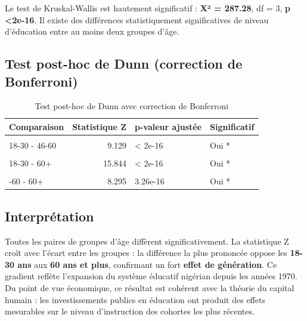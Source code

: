 \documentclass[
]{article}
\begin{document}
Le test de Kruskal-Wallis est hautement significatif : \textbf{X² =
287.28}, df = 3, \textbf{p \textless2e-16}. Il existe des différences
statistiquement significatives de niveau d'éducation entre au moins deux
groupes d'âge.

\subsection{Test post-hoc de Dunn (correction de
Bonferroni)}\label{test-post-hoc-de-dunn-correction-de-bonferroni}

\begin{longtable}[t]{lrll}
\caption{\label{tab:tableau-dunn}Test post-hoc de Dunn avec correction de Bonferroni}\\
\toprule
Comparaison & Statistique Z & p-valeur ajustée & Significatif\\
\midrule
\cellcolor{gray!10}{18-30 - 31-45} & \cellcolor{gray!10}{4.594} & \cellcolor{gray!10}{1.30e-05} & \cellcolor{gray!10}{Oui *}\\
18-30 - 46-60 & 9.129 & < 2e-16 & Oui *\\
\cellcolor{gray!10}{31-45 - 46-60} & \cellcolor{gray!10}{4.956} & \cellcolor{gray!10}{2.16e-06} & \cellcolor{gray!10}{Oui *}\\
18-30 - 60+ & 15.844 & < 2e-16 & Oui *\\
\cellcolor{gray!10}{31-45 - 60+} & \cellcolor{gray!10}{12.598} & \cellcolor{gray!10}{< 2e-16} & \cellcolor{gray!10}{Oui *}\\
\addlinespace
46-60 - 60+ & 8.295 & 3.26e-16 & Oui *\\
\bottomrule
\end{longtable}

\subsection{Interprétation}\label{interpruxe9tation-2}

Toutes les paires de groupes d'âge diffèrent significativement. La
statistique Z croît avec l'écart entre les groupes : la différence la
plus prononcée oppose les \textbf{18-30 ans} aux \textbf{60 ans et
plus}, confirmant un fort \textbf{effet de génération}. Ce gradient
reflète l'expansion du système éducatif nigérian depuis les années 1970.
Du point de vue économique, ce résultat est cohérent avec la théorie du
capital humain : les investissements publics en éducation ont produit
des effets mesurables sur le niveau d'instruction des cohortes les plus
récentes.
\end{document}
